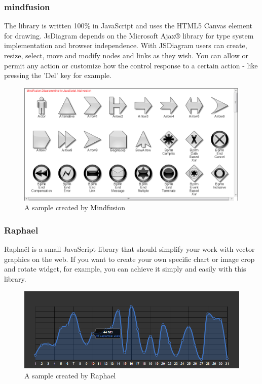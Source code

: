 \documentclass[14pt,a4paper]{extreport}
\begin{document}
 			\subsubsection{mindfusion}
 			The library is written 100\% in JavaScript and uses the HTML5 Canvas element for drawing. JsDiagram depends on the Microsoft Ajax® library for type system implementation and browser independence. With JSDiagram users can create, resize, select, move and modify nodes and links as they wish. You can allow or permit any action or customize how the control response to a certain action - like pressing the 'Del' key for example.
 			\begin{figure}[ht]
 					\begin{center}
 						\includegraphics[scale=0.5]{mindfusion.png}
 						\caption{A sample created by Mindfusion}
 					\end{center}
 				\end{figure} 
 			
 			\subsubsection{Raphael}
 			Raphaël is a small JavaScript library that should simplify your work with vector graphics on the web. If you want to create your own specific chart or image crop and rotate widget, for example, you can achieve it simply and easily with this library.
 			\begin{figure}[ht]
 					\begin{center}
 						\includegraphics[scale=0.5]{rafael.png}
 						\caption{A sample created by Raphael}
 					\end{center}
 				\end{figure} 
 			
\end{document}
